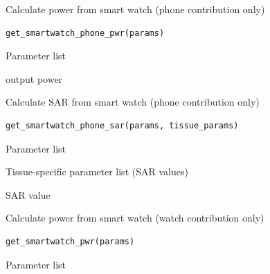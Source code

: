\documentclass[a4paper]{book}
\begin{document}
%
\begin{Description}
Calculate power from smart watch (phone contribution only)
\end{Description}
%
\begin{Usage}
\begin{verbatim}
get_smartwatch_phone_pwr(params)
\end{verbatim}
\end{Usage}
%
\begin{Arguments}
\begin{ldescription}
\item[\code{params}] Parameter list
\end{ldescription}
\end{Arguments}
%
\begin{Value}
output power
\end{Value}
%
\begin{Description}
Calculate SAR from smart watch (phone contribution only)
\end{Description}
%
\begin{Usage}
\begin{verbatim}
get_smartwatch_phone_sar(params, tissue_params)
\end{verbatim}
\end{Usage}
%
\begin{Arguments}
\begin{ldescription}
\item[\code{params}] Parameter list

\item[\code{tissue\_params}] Tissue-specific parameter list (SAR values)
\end{ldescription}
\end{Arguments}
%
\begin{Value}
SAR value
\end{Value}
%
\begin{Description}
Calculate power from smart watch (watch contribution only)
\end{Description}
%
\begin{Usage}
\begin{verbatim}
get_smartwatch_pwr(params)
\end{verbatim}
\end{Usage}
%
\begin{Arguments}
\begin{ldescription}
\item[\code{params}] Parameter list
\end{ldescription}
\end{Arguments}
\end{document}
